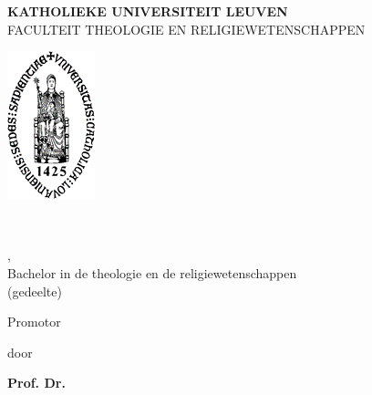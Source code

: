 \begin{titlepage}	
\begin{singlespace}
    \begin{center}
        \textbf{\Huge KATHOLIEKE UNIVERSITEIT LEUVEN}\\
        \medskip
        \huge FACULTEIT THEOLOGIE EN RELIGIEWETENSCHAPPEN
            
        \bigskip
    \begin{center}\includegraphics{Logo.png}\end{center}
                \bigskip
                \bigskip
        \textbf{\textsc{\Huge \titel}}\\
        \textsc{\Huge\subtitel}\linebreak
    \end{center}\vfill
    \bigskip
    \begin{minipage}{2.2in}
    \end{minipage}\hfill \begin{minipage}{2in}
    \taak,\\
     Bachelor in de theologie en de religiewetenschappen \\(\fase gedeelte)\\
    \end{minipage}\linebreak
    \begin{minipage}{2in}
    Promotor\\
    \end{minipage}
    \hfill
    \begin{minipage}{2in}
     door\\
    \end{minipage}\linebreak 
    \begin{minipage}{3in}
    \textbf{Prof. Dr. \promotor} 
    \end{minipage}
    \hfill
    \begin{minipage}{2in}
    \textbf{\auteur}
    \end{minipage}
    \vfill
\begin{center}
    \jaartal
\end{center}	
\end{singlespace}
\end{titlepage}
